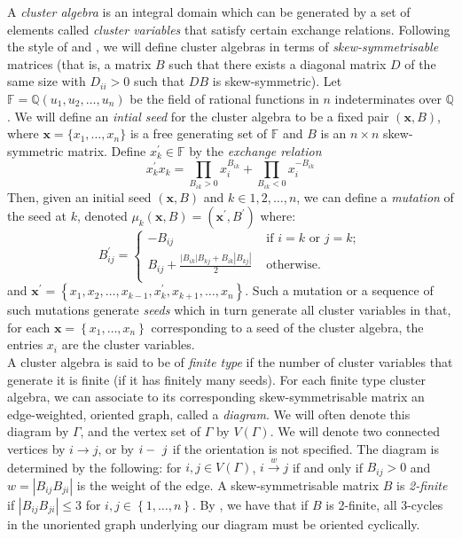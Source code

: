 \documentclass[11pt]{amsart}
\theoremstyle{definition}
\newcommand\V{V(\Gamma)}
\begin{document}
A \textit{cluster algebra} is an integral domain which can be generated by a set of elements called \textit{cluster variables} that satisfy certain exchange relations. Following the style of \cite{FZ02} and \cite{BM13}, we will define cluster algebras in terms of \textit{skew-symmetrisable} matrices (that is, a matrix $B$ such that there exists a diagonal matrix $D$ of the same size with $D_{ii} >0$ such that $DB$ is skew-symmetric). Let $\mathbb{F} = \mathbb{Q}(u_1, u_2, \ldots, u_n)$ be the field of rational functions in $n$ indeterminates over $\mathbb{Q}$. We will define an \textit{intial seed} for the cluster algebra to be a fixed pair $(\textbf{x}, B)$, where $\textbf{x} = \{x_1, \ldots, x_n\}$ is a free generating set of $\mathbb{F}$ and $B$ is an $n \times n$ skew-symmetric matrix. Define $x_k^{\prime} \in \mathbb{F}$ by the \textit{exchange relation}
\begin{displaymath}
x_k^{\prime}x_k = \prod_{B_{ik} > 0}{x_i^{B_{ik}}} + \prod_{B_{ik} < 0}{x_i^{-B_{ik}}}
\end{displaymath}
Then, given an initial seed $(\textbf{x}, B)$ and $k \in {1,2,\ldots,n}$, we can define a \textit{mutation} of the seed at $k$, denoted $\mu_k(\boldsymbol{x}, B) = (\textbf{x}^{\prime}, B^{\prime})$ where:
\begin{displaymath}
B_{ij}^{\prime} = \begin{cases} - B_{ij} & \mbox{ if } i = k \mbox{ or } j = k;\\
B_{ij} + \frac{|B_{ik}|B_{kj} + B_{ik}|B_{kj}|}{2} & \mbox{ otherwise. }\\
\end{cases}
\end{displaymath}
and $\textbf{x}^{\prime} = \left\{ x_1, x_2, \ldots, x_{k-1}, x_k^{\prime}, x_{k+1}, \ldots, x_n \right\}$.
Such a mutation or a sequence of such mutations generate \textit{seeds} which in turn generate all cluster variables in that, for each $\textbf{x} = \left\{ x_1, \ldots, x_n \right\}$ corresponding to a seed of the cluster algebra, the entries $x_i$ are the cluster variables. \\

 A cluster algebra is said to be of \textit{finite type} if the number of cluster variables that generate it is finite (if it has finitely many seeds). For each finite type cluster algebra, we can associate to its corresponding skew-symmetrisable matrix an edge-weighted, oriented graph, called a \textit{diagram}. We will often denote this diagram by $\Gamma$, and the vertex set of $\Gamma$ by $\V$. We will denote two connected vertices by $i \rightarrow j$, or by $i\--\ j$ if the orientation is not specified. The diagram is determined by the following: for $i, j \in \V$, $i \xrightarrow{w} j$ if and only if $B_{ij} > 0$ and $w = |B_{ij}B_{ji}|$ is the weight of the edge. A skew-symmetrisable matrix $B$ is \textit{2-finite} if $|B_{ij}B_{ji}| \leq 3$ for $i, j \in \left\{ 1, \ldots, n \right\}$. By \cite[7.5]{FZ02}, we have that if $B$ is 2-finite, all 3-cycles in the unoriented graph underlying our diagram must be oriented cyclically. \\
\end{document}
